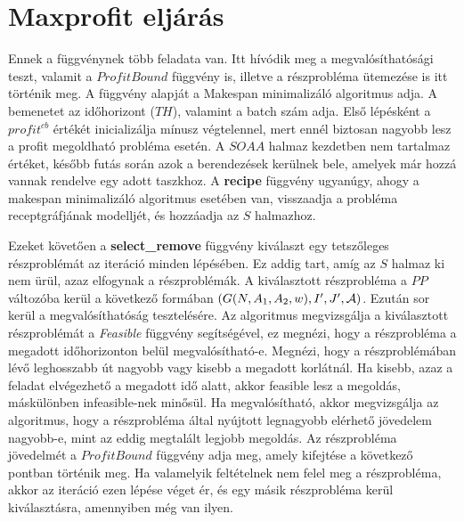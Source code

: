 \section{Maxprofit eljárás}
Ennek a függvénynek több feladata van. Itt hívódik meg a megvalósíthatósági teszt, valamit a $ProfitBound$ függvény is, illetve a részprobléma ütemezése is itt történik meg. A függvény alapját a Makespan minimalizáló algoritmus adja. A bemenetet az időhorizont ($TH$), valamint a batch szám adja. Első lépésként a $profit^{cb}$ értékét inicializálja mínusz végtelennel, mert ennél biztosan nagyobb lesz a profit megoldható probléma esetén. A $SOAA$ halmaz kezdetben nem tartalmaz értéket, később futás során azok a berendezések kerülnek bele, amelyek már hozzá vannak rendelve egy adott taszkhoz. A \textbf{recipe} függvény ugyanúgy, ahogy a makespan minimalizáló algoritmus esetében van, visszaadja a probléma receptgráfjának modelljét, és hozzáadja az $S$ halmazhoz.

Ezeket követően a \textbf{select\_remove} függvény kiválaszt egy tetszőleges részproblémát az iteráció minden lépésében. Ez addig tart, amíg az $S$ halmaz ki nem ürül, azaz elfogynak a részproblémák. A kiválasztott részprobléma a $PP$ változóba kerül a következő formában  $(G(N,A_1,A_2,w),I',J',{\cal A})$. Ezután sor kerül a megvalósíthatóság tesztelésére. Az algoritmus megvizsgálja a kiválasztott részproblémát a \textit{Feasible} függvény segítségével, ez megnézi, hogy a részprobléma a megadott időhorizonton belül megvalósítható-e. Megnézi, hogy a részproblémában lévő leghosszabb út nagyobb vagy kisebb a megadott korlátnál. Ha kisebb, azaz a feladat elvégezhető a megadott idő alatt, akkor feasible lesz a megoldás, máskülönben infeasible-nek minősül. Ha megvalósítható, akkor megvizsgálja az algoritmus, hogy a részprobléma által nyújtott legnagyobb elérhető jövedelem nagyobb-e, mint az eddig megtalált legjobb megoldás. Az részprobléma jövedelmét a $ProfitBound$ függvény adja meg, amely kifejtése a következő pontban történik meg. Ha valamelyik feltételnek nem felel meg a részprobléma, akkor az iteráció ezen lépése véget ér, és egy másik részprobléma kerül kiválasztásra, amennyiben még van ilyen.

